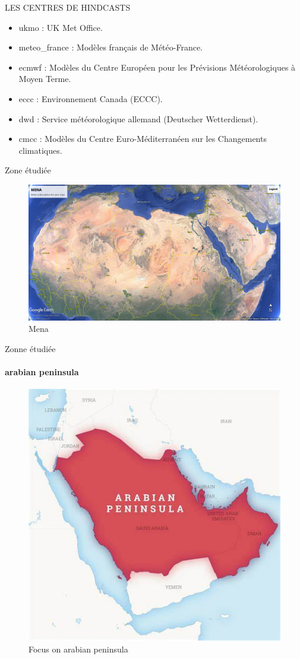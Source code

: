 \begin{frame}{LES CENTRES DE HINDCASTS}
\begin{itemize}
    \item ukmo : UK Met Office.
    \item meteo\_france : Modèles français de Météo-France.
    \item ecmwf : Modèles du Centre Européen pour les Prévisions Météorologiques à Moyen Terme.
    \item eccc : Environnement Canada (ECCC).
    \item dwd : Service météorologique allemand (Deutscher Wetterdienst).
    \item cmcc : Modèles du Centre Euro-Méditerranéen sur les Changements climatiques.
\end{itemize}
\end{frame}
\begin{frame}{Zone étudiée}
\begin{figure}
    \centering
    \includegraphics[width=0.75\linewidth]{mena.jpg}
    \caption{Mena}
    \label{fig:enter-label}
\end{figure}
\end{frame}
\begin{frame}{Zonne étudiée}
\framesubtitle{arabian peninsula }
\begin{figure}
    \centering
    \includegraphics[width=0.75\linewidth]{arabian_peninsula.png}
    \caption{Focus on arabian peninsula}
    \label{fig:enter-label}
\end{figure}
\end{frame}
